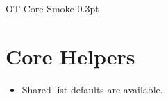 \documentclass{article}
\begin{document}

\otcorelistdefaults
\otcorepagestyle
  {\textcolor{OTMuted}{OT Core Smoke}}
  {\textcolor{OTMuted}{\leftmark}}
  {0.3pt}

\section{Core Helpers}

\begin{itemize}
  \item Shared list defaults are available.
\end{itemize}
\end{document}
